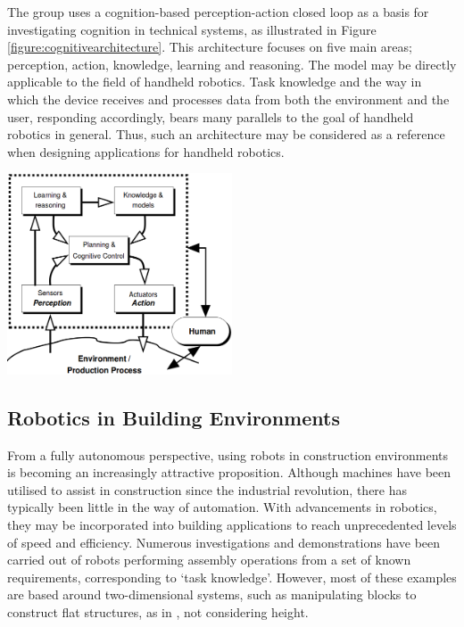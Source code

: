 \documentclass[11pt]{article}
\begin{document}
The group uses a cognition-based perception-action closed loop as a basis for investigating cognition in technical systems, as illustrated in Figure \ref{figure:cognitivearchitecture}. This architecture focuses on five main areas; perception, action, knowledge, learning and reasoning. The model may be directly applicable to the field of handheld robotics. Task knowledge and the way in which the device receives and processes data from both the environment and the user, responding accordingly, bears many parallels to the goal of handheld robotics in general. Thus, such an architecture may be considered as a reference when designing applications for handheld robotics. 

\begin{center}
\includegraphics[width = 0.5\textwidth]{cognitivearchitecture.png}
\label{figure:cognitivearchitecture}
\end{center}

\pagebreak














\subsection{Robotics in Building Environments} \label{building}

From a fully autonomous perspective, using robots in construction environments is becoming an increasingly attractive proposition. Although machines have been utilised to assist in construction since the industrial revolution, there has typically been little in the way of automation. With advancements in robotics, they may be incorporated into building applications to reach unprecedented levels of speed and efficiency. Numerous investigations and demonstrations have been carried out of robots performing assembly operations from a set of known requirements, corresponding to `task knowledge'. However, most of these examples are based around two-dimensional systems, such as manipulating blocks to construct flat structures, as in \cite{werfel2006}, not considering height.
\end{document}
